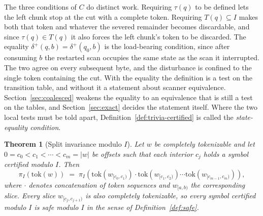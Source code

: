 \documentclass[11pt,a4paper]{article}
\theoremstyle{definition}
\theoremstyle{plain}
\newtheorem{theorem}{Theorem}
\begin{document}
The three conditions of $C$ do distinct work. Requiring $\tau(q)$ to be defined lets the left chunk stop at the cut with
a complete token. Requiring $T(q) \subseteq I$ makes both that token and whatever the severed remainder becomes
discardable, and since $\tau(q) \in T(q)$ it also forces the left chunk's token to be discarded. The equality
$\delta^+(q, b) = \delta^+(q_0, b)$ is the load-bearing condition, since after consuming $b$ the restarted scan occupies
the same state as the scan it interrupted. The two agree on every subsequent byte, and the disturbance is confined to
the single token containing the cut. With the equality the definition is a test on the transition table, and without it
a statement about scanner equivalence. Section~\ref{sec:coalesced} weakens the equality to an equivalence that is still
a test on the tables, and Section~\ref{sec:exact} decides the statement itself. Where the two local tests must be told
apart, Definition~\ref{def:trivia-certified} is called the \emph{state-equality condition}.

\begin{theorem}[Split invariance modulo $I$]
\label{thm:trivia}
Let $w$ be completely tokenizable and let $0 = c_0 < c_1 < \cdots < c_m = |w|$ be offsets such that each interior $c_j$
holds a symbol certified modulo $I$. Then
\[
\pi_I(\mathrm{tok}(w)) \;=\; \pi_I\!\left(\mathrm{tok}(w_{[c_0,c_1)}) \cdot \mathrm{tok}(w_{[c_1,c_2)}) \cdots
\mathrm{tok}(w_{[c_{m-1},c_m)})\right),
\]
where $\cdot$ denotes concatenation of token sequences and $w_{[a,b)}$ the corresponding slice. Every slice
$w_{[c_j,c_{j+1})}$ is also completely tokenizable, so every symbol certified modulo $I$ is safe modulo $I$ in the sense
of Definition~\ref{def:safe}.
\end{theorem}
\end{document}

